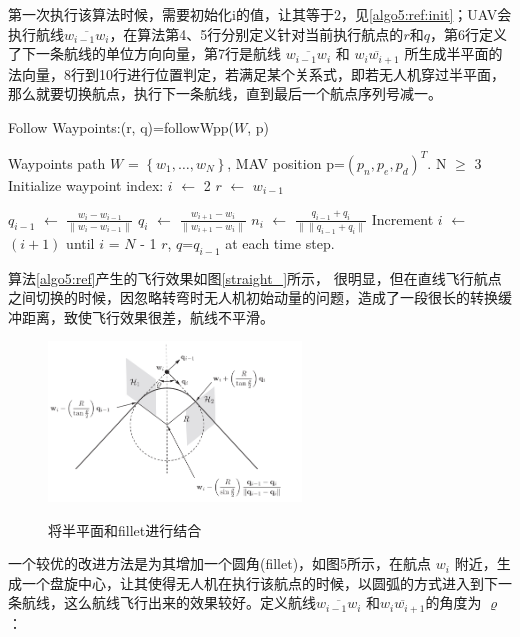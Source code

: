 \documentclass[UTF8,a4paper,10pt,nocolorlinks]{ctexart}
\begin{document}
    第一次执行该算法时候，需要初始化i的值，让其等于2，见\ref{algo5:ref:init}；UAV会执行航线$\overline{w_{i-1}w_{i}}$，在算法第4、5行分别定义针对当前执行航点的$r$和$q$，第6行定义了下一条航线的单位方向向量，第7行是航线 $\overline{w_{i-1}w_{i}}$ 和 $\overline{w_{i}w_{i+1}}$ 所生成半平面的法向量，8行到10行进行位置判定，若满足某个关系式，即若无人机穿过半平面，
    那么就要切换航点，执行下一条航线，直到最后一个航点序列号减一。
    \begin{algorithm}[h]
            \caption{Follow Waypoints:(r, q)=followWpp($\textit{W}$, p)}
            \label{algo5:ref}
            \begin{algorithmic}[1]
                \ENSURE Waypoints path $\textit{W}$ = $\left\{ w_{1}, \dots, w_{N} \right\}$, MAV position p=$(p_{n}, p_{e}, p_{d})^{T}$.
                \REQUIRE N $\geq$ 3
                    \STATE Initialize waypoint index: $i$ $\gets$ 2
                    \label{algo5:ref:init}
                \ENDIF
                \STATE $r$ $\gets$ $w_{i-1}$

                \STATE $q_{i-1}$ $\gets$ $\frac{w_{i}-w_{i-1}}{\lVert w_{i}-w_{i-1} \rVert}$
                \STATE $q_{i}$ $\gets$ $\frac{w_{i+1}-w_{i}}{\lVert w_{i+1}-w_{i} \rVert}$
                \STATE $n_{i}$ $\gets$ $\frac{q_{i-1}+q_{i}}{\lVert \| q_{i-1}+q_{i} \rVert}$
                    \STATE Increment $i$ $\gets$ $\left(i+1\right)$ until $i$ = $N$ - 1
                \ENDIF
                \RETURN $r$, $q$=$q_{i-1}$ at each time step.  %
            \end{algorithmic}
        \end{algorithm}

        \par 算法\ref{algo5:ref}产生的飞行效果如图\ref{straight_}所示，
        很明显，但在直线飞行航点之间切换的时候，因忽略转弯时无人机初始动量的问题，造成了一段很长的转换缓冲距离，致使飞行效果很差，航线不平滑。
    \begin{figure}[h]
        \centering
        \includegraphics[width=0.6\textwidth]{picture/algo6_3.png}
        \label{algo6_1}
        \caption{将半平面和fillet进行结合}
    \end{figure}
    \par 一个较优的改进方法是为其增加一个圆角(fillet)，如图5所示，在航点 $w_{i}$ 附近，生成一个盘旋中心，让其使得无人机在执行该航点的时候，以圆弧的方式进入到下一条航线，这么航线飞行出来的效果较好。定义航线$\overline{w_{i-1}w_{i}}$ 和$\overline{w_{i}w_{i+1}}$的角度为 $\varrho$：
    
\end{document}
